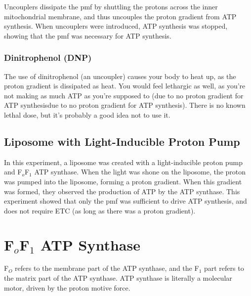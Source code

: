 Uncouplers dissipate the pmf by shuttling the protons across the inner mitochondrial membrane, and thus uncouples the proton gradient from ATP synthesis.
When uncouplers were introduced, ATP synthesis was stopped, showing that the pmf was necessary for ATP synthesis.

\subsubsection{Dinitrophenol (DNP)}

\begin{center}
\end{center}

The use of dinitrophenol (an uncoupler) causes your body to heat up, as the proton gradient is dissipated as heat.
You would feel lethargic as well, as you're not making as much ATP as you're supposed to (due to no proton gradient for ATP synthesisdue to no proton gradient for ATP synthesis).
There is no known lethal dose, but it's probably a good idea not to use it.

\subsection{Liposome with Light-Inducible Proton Pump}

\begin{center}
\end{center}

In this experiment, a liposome was created with a light-inducible proton pump and F$_o$F$_1$ ATP synthase.
When the light was shone on the liposome, the proton was pumped into the liposome, forming a proton gradient.
When this gradient was formed, they observed the production of ATP by the ATP synthase.
This experiment showed that only the pmf was sufficient to drive ATP synthesis, and does not require ETC (as long as there was a proton gradient).

\section{F$_o$F$_1$ ATP Synthase}

\begin{center}
\end{center}

F$_O$ refers to the membrane part of the ATP synthase, and the F$_1$ part refers to the matrix part of the ATP synthase.
ATP synthase is literally a molecular motor, driven by the proton motive force.

